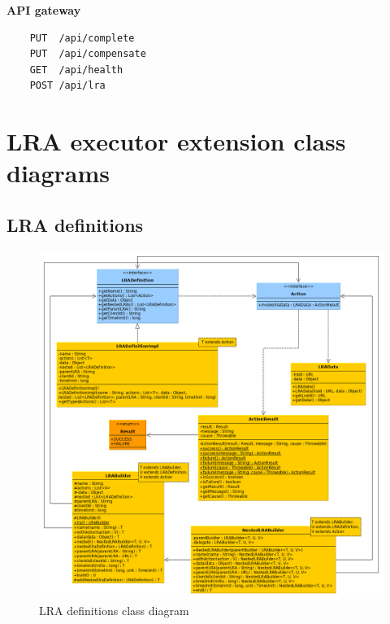 \documentclass[oneside,
  digital, %
  table,   %
  lof,     %
  lot,     %
]{fithesis3}
\begin{document}
\clearpage

\noindent
\textbf{API gateway}

\begin{verbatim}
    PUT  /api/complete
    PUT  /api/compensate
    GET  /api/health
    POST /api/lra
\end{verbatim}


\clearpage
\chapter{LRA executor extension class diagrams}
\label{sec:appendix-class-diagrams}

\section{LRA definitions}

\hfill \break

\begin{figure}[h]
    \begin{center}
       \includegraphics[trim=4cm 0 -2cm 4cm,width=1.1\textwidth]{images/classDiagrams/lra-definitions.png}
    \end{center}
    \caption{LRA definitions class diagram}
    \label{fig:lra-definition-class-diagram}
\end{figure}
\end{document}

